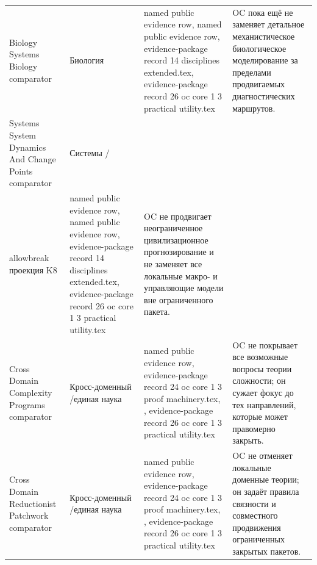 \begin{longtable}{@{}L{0.20\textwidth}L{0.11\textwidth}L{0.33\textwidth}L{0.28\textwidth}@{}}
Biology Systems Biology comparator & Биология & named public evidence row, named public evidence row, \allowbreak evidence-package record 14 disciplines extended.tex, \allowbreak evidence-package record 26 oc core 1 3 practical utility.tex & OC пока ещё не заменяет детальное механистическое биологическое моделирование за пределами продвигаемых диагностических маршрутов. \\
Systems System Dynamics And Change Points comparator & Системы /\\allowbreak проекция K8 & named public evidence row, named public evidence row, \allowbreak evidence-package record 14 disciplines extended.tex, \allowbreak evidence-package record 26 oc core 1 3 practical utility.tex & OC не продвигает неограниченное цивилизационное прогнозирование и не заменяет все локальные макро- и управляющие модели вне ограниченного пакета. \\
Cross Domain Complexity Programs comparator & Кросс-доменный /\allowbreak единая наука & named public evidence row, \allowbreak evidence-package record 24 oc core 1 3 proof machinery.tex, \allowbreak {}, \allowbreak evidence-package record 26 oc core 1 3 practical utility.tex & OC не покрывает все возможные вопросы теории сложности; он сужает фокус до тех направлений, которые может правомерно закрыть. \\
Cross Domain Reductionist Patchwork comparator & Кросс-доменный /\allowbreak единая наука & named public evidence row, \allowbreak evidence-package record 24 oc core 1 3 proof machinery.tex, \allowbreak {}, \allowbreak evidence-package record 26 oc core 1 3 practical utility.tex & OC не отменяет локальные доменные теории; он задаёт правила связности и совместного продвижения ограниченных закрытых пакетов. \\
\bottomrule
\end{longtable}

